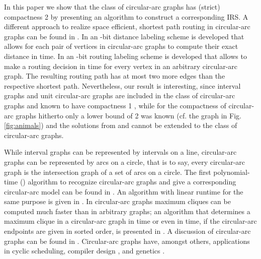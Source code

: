 \documentclass[10pt]{article}
\begin{document}
In this paper we show that the class of circular-arc graphs has (strict) compactness 2 
by presenting an algorithm to construct a corresponding IRS. A different approach to realize 
space efficient, shortest path routing in circular-arc graphs can be found 
in \cite{f.dragan:new}. In \cite{GP08} an -bit distance
labeling scheme is developed that allows for each pair of vertices in circular-arc graphs to
compute their exact distance in  time.
In \cite{DYL06} an -bit routing labeling scheme is developed that allows 
to make a routing decision in   time for every vertex in an arbitrary circular-arc graph. 
The resulting routing path has at most two more edges than the respective shortest path.
Nevertheless, our result is interesting, since interval graphs and 
unit circular-arc graphs  are included in the class of circular-arc graphs and known to have 
compactness 1 \cite{FG98,NS96}, while for the compactness of circular-arc graphs hitherto 
only a lower bound of 2 was known (cf. the graph in Fig. \ref{fig:animals}) 
and the solutions from  \cite{FG98} and \cite{NS96} 
cannot be extended to the class of circular-arc graphs.
   
While interval graphs can be represented by intervals on a line, circular-arc graphs can be 
represented by arcs on a circle, that is to say, every circular-arc graph is the intersection 
graph of a set of arcs on a circle.
The first polynomial-time () algorithm 
to recognize circular-arc graphs and give a corresponding  circular-arc model can be found 
in \cite{firstCAG}. An algorithm with linear runtime for the same purpose is given 
in \cite{MCC03}. In circular-arc graphs maximum cliques can 
be computed much faster than in arbitrary graphs; an algorithm that determines a maximum 
clique in a circular-arc graph in  time or even in  time, 
if the circular-arc endpoints are given in sorted order, is presented 
in \cite{Bhattacharya1997336}. A discussion of circular-arc graphs can be found 
in \cite{Hsu95}. Circular-arc graphs have, amongst others, applications 
in cyclic scheduling, compiler design \cite{Gol04,tucker:493}, 
and genetics \cite{Rob76}.
\end{document}
